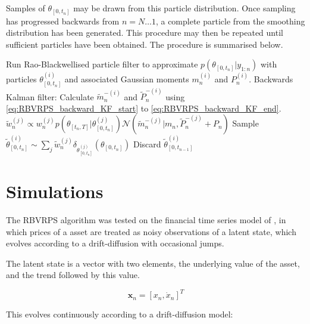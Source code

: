 \documentclass[journal]{IEEEtran}
\begin{document}
Samples of $\theta_{[0,t_n]}$ may be drawn from this particle distribution. Once sampling has progressed backwards from $n=N \dots 1$, a complete particle from the smoothing distribution has been generated. This procedure may then be repeated until sufficient particles have been obtained. The procedure is summarised below.%

\begin{algorithmic}
  \STATE Run Rao-Blackwellised particle filter to approximate $p(\theta_{[0,t_n]}|y_{1:n})$ with particles $\theta_{[0,t_n]}^{(i)}$ and associated Gaussian moments $m_{n}^{(i)}$ and $P_{n}^{(i)}$.
      \STATE Backwards Kalman filter: Calculate $\tilde{m}_n^{-(i)}$ and $\tilde{P}_n^{-(i)}$ using \ref{eq:RBVRPS_backward_KF_start} to \ref{eq:RBVRPS_backward_KF_end}.
	      \STATE $\tilde{w}_n^{(j)} \propto w_n^{(j)} p(\theta_{[t_n,T]}|\theta_{[0,t_n]}^{(j)}) \mathcal{N}(\tilde{m}_n^{-(j)}|m_n, \tilde{P}_n^{-(j)} + P_n)$
      \ENDFOR
      \STATE Sample $\tilde{\theta}_{[0,t_n]}^{(i)} \sim \sum_j \tilde{w}_n^{(j)} \delta_{\theta_{[0,t_n]}^{(j)}}(\theta_{[0,t_n]})$
      \STATE Discard $\tilde{\theta}_{[0,t_{n-1}]}^{(i)}$
    \ENDFOR
  \ENDFOR
\end{algorithmic}



\section{Simulations} \label{sec:simulations}

The RBVRPS algorithm was tested on the financial time series model of \cite{Godsill2007a,Christensen2012}, in which prices of a asset are treated as noisy observations of a latent state, which evolves according to a drift-diffusion with occasional jumps. 

The latent state is a vector with two elements, the underlying value of the asset, and the trend followed by this value.

\begin{equation}
 \mathbf{x}_n = [ x_n, \dot{x}_n]^T
\end{equation}

This evolves continuously according to a drift-diffusion model:
\end{document}
